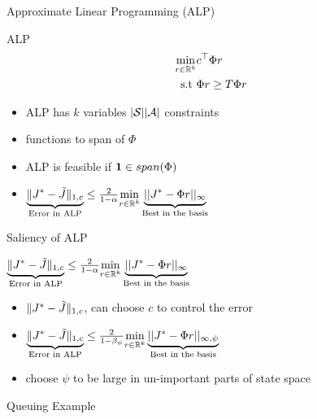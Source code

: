 \documentclass[10pt,handout]{beamer}
\begin{document}
\begin{frame}[fragile]{Approximate Linear Programming (ALP)}
\begin{block}{ALP \cite{schweitzer1985generalized,de2003linear}}
\begin{align*}
\min_{r\in \mathbb{R}^k} &c^\top \Phi r\\
\text{s.t}\mbox{ } &\Phi r\geq T \Phi r
\end{align*}
\end{block}

\begin{itemize}
\item ALP has $k$ variables $|\mathcal{S}||\mathcal{A}|$ constraints
\item {\color{orange}{superharmonic}} functions {\color{orange}{restricted}} to span of $\Phi$
\item ALP is feasible if $\mathbf{1} \in span(\Phi)$
\item $\underbrace{\|J^*-\tilde{J}\|_{1,c}}_{\text{Error in ALP}}\leq \frac{2}{1-\alpha}\underset{r\in \mathbb{R}^k}{\min}\underbrace{||J^*-\Phi r||_{\infty}}_{\text{Best in the basis}}$
\end{itemize}
\end{frame}

\begin{frame}[fragile]{Saliency of ALP}
\begin{block}{}
$\underbrace{\|J^*-\tilde{J}\|_{1,c}}_{\text{Error in ALP}}\leq \frac{2}{1-\alpha}\underset{r\in \mathbb{R}^k}{\min}\underbrace{||J^*-\Phi r||_{\infty}}_{\text{Best in the basis}}$
\end{block}
\begin{itemize}
\item $\|J^*-\tilde{J}\|_{1,c}$, can choose $c$ to control the error
\item $\underbrace{\|J^*-\tilde{J}\|_{1,c}}_{\text{Error in ALP}}\leq \frac{2}{1-\beta_\psi}\underset{r\in \mathbb{R}^k}{\min}\underbrace{||J^*-\Phi r||_{\infty,\psi}}_{\text{Best in the basis}}$
\item \cite{de2003linear,de2004constraint} choose $\psi$ to be large in un-important parts of state space
\end{itemize}
\begin{block}{Queuing Example}

\end{block}

\end{frame}
\end{document}

